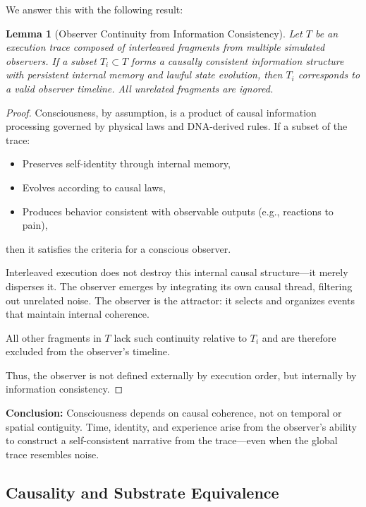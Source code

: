\documentclass[11pt]{article}
\newtheorem{lemma}{Lemma}
\begin{document}
We answer this with the following result:

\begin{lemma}[Observer Continuity from Information Consistency]
  Let $T$ be an execution trace composed of interleaved fragments from multiple simulated observers.
  If a subset $T_i \subset T$ forms a causally consistent information structure with persistent internal memory
  and lawful state evolution, then $T_i$ corresponds to a valid observer timeline. All unrelated fragments are ignored.
\end{lemma}

\begin{proof}
  Consciousness, by assumption, is a product of causal information processing governed by physical laws
  and DNA-derived rules. If a subset of the trace:
  \begin{itemize}
    \item Preserves self-identity through internal memory,
    \item Evolves according to causal laws,
    \item Produces behavior consistent with observable outputs (e.g., reactions to pain),
  \end{itemize}
  then it satisfies the criteria for a conscious observer.

  Interleaved execution does not destroy this internal causal structure—it merely disperses it. The observer emerges by integrating its own causal thread, filtering out unrelated noise.
  The observer is the attractor: it selects and organizes events that maintain internal coherence.

  All other fragments in $T$ lack such continuity relative to $T_i$ and are therefore excluded from the observer’s timeline.

  Thus, the observer is not defined externally by execution order, but internally by information consistency.
\end{proof}

\textbf{Conclusion:} Consciousness depends on causal coherence, not on temporal or spatial contiguity. Time, identity, and experience arise from the observer’s ability to construct a self-consistent narrative from the trace—even when the global trace resembles noise.

\subsection{Causality and Substrate Equivalence}
\end{document}
